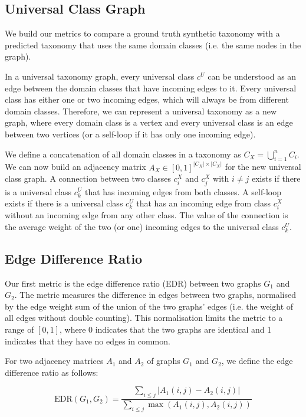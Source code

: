 \subsection{Universal Class Graph}

We build our metrics to compare a ground truth synthetic taxonomy with a predicted taxonomy
that uses the same domain classes (i.e. the same nodes in the graph).

In a universal taxonomy graph, every universal class $c^U$ can be understood as an edge
between the domain classes that have incoming edges to it.
Every universal class has either one or two incoming edges, which will always be from different domain classes.
Therefore, we can represent a universal taxonomy as a new graph,
where every domain class is a vertex and every universal class is an edge between two vertices
(or a self-loop if it has only one incoming edge).

We define a concatenation of all domain classes in a taxonomy as $C_X = \bigcup_{i=1}^{n} C_i$.
We can now build an adjacency matrix $A_X\in [0, 1]^{|C_X|\times|C_X|}$ for the new universal class graph.
A connection between two classes $c_i^X$ and $c_j^X$ with $i\neq j$ exists if there is a universal class $c_k^U$ that has incoming edges from both classes.
A self-loop exists if there is a universal class $c_k^U$ that has an incoming edge from class $c_i^X$ without an incoming edge from any other class.
The value of the connection is the average weight of the two (or one) incoming edges to the universal class $c_k^U$.

\subsection{Edge Difference Ratio}

Our first metric is the edge difference ratio (EDR) between two graphs $G_1$ and $G_2$.
The metric measures the difference in edges between two graphs,
normalised by the edge weight sum of the union of the two graphs' edges (i.e. the weight of all edges without double counting).
This normalisation limits the metric to a range of $[0, 1]$,
where 0 indicates that the two graphs are identical and 1 indicates that they have no edges in common.

For two adjacency matrices $A_1$ and $A_2$ of graphs $G_1$ and $G_2$,
we define the edge difference ratio as follows:

\begin{equation}
    \text{EDR}(G_1, G_2) = \frac{\sum_{i \leq j} |A_1(i,j) - A_2(i,j)|}{\sum_{i \leq j} \max(A_1(i,j), A_2(i,j))}
\end{equation}

